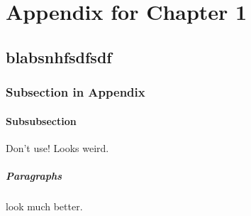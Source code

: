 \chapter{Appendix for Chapter 1}
\section{blabsnhfsdfsdf}
\subsection{Subsection in Appendix}
\subsubsection{Subsubsection}
Don't use! Looks weird.
\paragraph{Paragraphs} look much better.